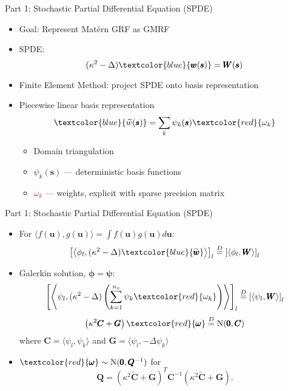 \documentclass{beamer}
\begin{document}
\begin{frame}{Part 1: Stochastic Partial Differential Equation (SPDE)}{\citep{Lindgren2011}}

\begin{itemize}
\addtolength{\itemsep}{0.5\baselineskip}
\item Goal: Represent Mat\'ern GRF as GMRF
\item SPDE:
$$ (\kappa^{2} - \Delta)\textcolor{blue}{\pmb{w}(\pmb{s})} = \pmb{W}(\pmb{s})$$
\item Finite Element Method: project SPDE onto basis representation
\item Piecewise linear basis representation
$$ \textcolor{blue}{\widetilde{w}(\pmb{s})} = \sum_{k} \psi_{k}(\pmb{s})\textcolor{red}{\omega_{k}}$$
        \begin{itemize}
        \addtolength{\itemsep}{0.5\baselineskip}
        \item Domain triangulation
        \item $\psi_{k}(\pmb{s})$ --- deterministic basis functions
        \item \textcolor{red}{$\omega_{k}$} --- weights, explicit with sparse precision matrix
        \end{itemize}
\end{itemize}

\end{frame}


\begin{frame}{Part 1: Stochastic Partial Differential Equation (SPDE)}{\citep{Lindgren2011}}
\begin{itemize}
\item For $\langle f(\pmb{u}), g(\pmb{u}) \rangle = \int f(\pmb{u}) g(\pmb{u}) d\pmb{u}$:
$$ \left[ \left< \phi_{l}, (\kappa^{2} - \Delta) \textcolor{blue}{\widetilde{\pmb{w}}} \right> \right]_{l} 
\overset{D}{=}
\left[ \left< \phi_{l}, \pmb{W} \right> \right]_{l} $$

\item Galerkin solution, $\pmb{\phi} = \pmb{\psi}$:
$$ \left[ \left< \psi_{l}, (\kappa^{2} - \Delta) \left( \sum_{k=1}^{n_{v}} \psi_{k} \textcolor{red}{\omega_{k}} \right) \right> \right]_{l} 
\overset{D}{=}
\left[ \langle \psi_{l}, \pmb{W} \rangle \right]_{l} $$
$$ \left(
\kappa^{2} \pmb{C} + \pmb{G} \right) \textcolor{red}{\pmb{\omega}} \overset{D}{=} \text{N}(\pmb{0},\pmb{C})$$
where $\pmb{C} = \langle \psi_{l}, \psi_{k} \rangle$ and $ \pmb{G} = \langle \psi_{l}, - \Delta \psi_{k} \rangle$ \\
\item $\textcolor{red}{\pmb{\omega}} \sim \text{N}(\pmb{0}, \pmb{Q}^{-1})$ for
$$\pmb{Q} = \left( \kappa^{2} \widetilde{\pmb{C}} + \pmb{G} \right)^{T} \pmb{C}^{-1} \left( \kappa^{2} \widetilde{\pmb{C}} + \pmb{G} \right).$$
\end{itemize}
\end{frame}
\end{document}
